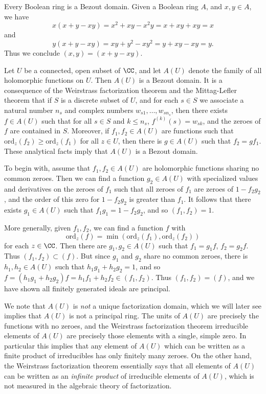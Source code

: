 \begin{example}
    Every Boolean ring is a Bezout domain. Given a Boolean ring $A$, and $x,y \in A$, we have
    \[ x(x + y - xy) = x^2 + xy - x^2y = x + xy + xy = x \]
    and
    \[ y(x  +y - xy) = xy + y^2 - xy^2 = y + xy - xy = y. \]
    Thus we conclude $(x,y) = (x + y - xy)$.
\end{example}

\begin{example}
    Let $U$ be a connected, open subset of $\CC$, and let $A(U)$ denote the family of all holomorphic functions on $U$. Then $A(U)$ is a Bezout domain. It is a consequence of the Weirstrass factorization theorem and the Mittag-Lefler theorem that if $S$ is a discrete subset of $U$, and for each $s \in S$ we associate a natural number $n_s$ and complex numbers $w_{s1}, \dots, w_{sn_s}$, then there exists $f \in A(U)$ such that for all $s \in S$ and $k \leq n_s$, $f^{(k)}(s) = w_{sk}$, and the zeroes of $f$ are contained in $S$. Moreover, if $f_1, f_2 \in A(U)$ are functions such that $\text{ord}_z(f_2) \geq \text{ord}_z(f_1)$ for all $z \in U$, then there is $g \in A(U)$ such that $f_2 = gf_1$. These analytical facts imply that $A(U)$ is a Bezout domain.

    To begin with, assume that $f_1, f_2 \in A(U)$ are holomorphic functions sharing no common zeroes. Then we can find a function $g_2 \in A(U)$ with specialized values and derivatives on the zeroes of $f_1$ such that all zeroes of $f_1$ are zeroes of $1 - f_2g_2$, and the order of this zero for $1 - f_2g_2$ is greater than $f_1$. It follows that there exists $g_1 \in A(U)$ such that $f_1g_1 = 1 - f_2g_2$, and so $(f_1,f_2) = 1$.

    More generally, given $f_1,f_2$, we can find a function $f$ with
    \[ \text{ord}_z(f) = \min(\text{ord}_z(f_1), \text{ord}_z(f_2)) \]
    for each $z \in \CC$. Then there are $g_1,g_2 \in A(U)$ such that $f_1 = g_1f$, $f_2 = g_2f$. Thus $(f_1,f_2) \subset (f)$. But since $g_1$ and $g_2$ share no common zeroes, there is $h_1, h_2 \in A(U)$ such that $h_1g_1 + h_2g_2 = 1$, and so $f = (h_1g_1 + h_2g_2)f = h_1f_1 + h_2f_2 \in (f_1,f_2)$. Thus $(f_1,f_2) = (f)$, and we have shown all finitely generated ideals are principal.

    We note that $A(U)$ is \emph{not} a unique factorization domain, which we will later see implies that $A(U)$ is not a principal ring. The units of $A(U)$ are precisely the functions with no zeroes, and the Weirstrass factorization theorem irreducible elements of $A(U)$ are precisely those elements with a single, simple zero. In particular this implies that any element of $A(U)$ which can be written as a finite product of irreducibles has only finitely many zeroes. On the other hand, the Weirstrass factorization theorem essentially says that all elements of $A(U)$ can be written as an \emph{infinite product} of irreducible elements of $A(U)$, which is not measured in the algebraic theory of factorization.
\end{example}

